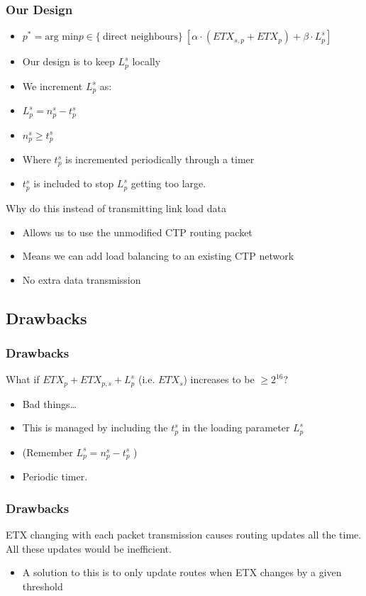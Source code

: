 \documentclass{beamer}
\begin{document}
\begin{frame}
  \frametitle{Our Design}
  \begin{itemize}
    \item $p^* = \text{arg min}  p \in \{\ \text{direct neighbours} \}\
      [\alpha  \cdot (ETX_{s,p} + ETX_p) + \beta \cdot L_p^s]$

    \item Our design is to keep $L_p^s$ locally 
    \item We increment $L_p^s$ as:
    \item $L_p^s = n_p^s - t_p^s$
    \item $n_p^s \geq t_p^s$
    \item Where $t_p^s$ is incremented periodically through a timer
    \item $t_p^s$ is included to stop $L_p^s$ getting too large.
    \end{itemize}
    Why do this instead of transmitting link load data
    \begin{itemize}
    \item Allows us to use the unmodified CTP routing packet
    \item Means we can add load balancing to an existing CTP network
    \item No extra data transmission
  \end{itemize}

\end{frame}

\subsection{Drawbacks}

\begin{frame}
  \frametitle{Drawbacks}
    What if $ETX_p + ETX_{p,s} + L_p^s$ (i.e. $ETX_s$) increases to be $\geq 2^{16}$?
  \begin{itemize}
    \item Bad things\ldots
    \item This is managed by including the $t_p^s$ in the loading parameter
    $L_p^s$
    \item (Remember $L_p^s = n_p^s - t_p^s$ )
    \item Periodic timer.
  \end{itemize}
\end{frame}  



\begin{frame}
  \frametitle{Drawbacks}
    ETX changing with each packet transmission causes routing updates all the
    time. All these updates would be inefficient.
  \begin{itemize}
    \item A solution to this is to only update routes when ETX changes by a given
    threshold
    \end{itemize}
\end{frame}  
\end{document}
